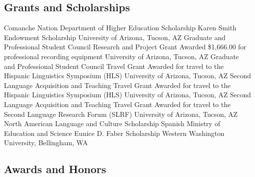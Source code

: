 \documentclass[11pt,letterpaper]{assets/tex/moderncv}
\begin{document}
\vspace{-0.2in}

\subsection{Grants and Scholarships}

        {Comanche Nation Department of Higher Education Scholarship}
        {}
        {}
        {}
        {}
        {}
        {Karen Smith Endowment Scholarship}
        {}
        {}
        {}
        {University of Arizona, Tucson, AZ}
        {Graduate and Professional Student Council Research and Project Grant}
        {\newline Awarded \$1,666.00 for professional recording equipment}
        {}
        {}
        {University of Arizona, Tucson, AZ}
        {Graduate and Professional Student Council Travel Grant}
        {\newline Awarded for travel to the Hispanic Linguistics Symposium (HLS)}
        {}
        {}
        {University of Arizona, Tucson, AZ}
        {Second Language Acquisition and Teaching Travel Grant}
        {\newline Awarded for travel to the Hispanic Linguistics Symposium (HLS)}
        {}
        {}
        {University of Arizona, Tucson, AZ}
        {Second Language Acquisition and Teaching Travel Grant}
        {\newline Awarded for travel to the Second Language Research Forum (SLRF)}
        {}
        {}
        {University of Arizona, Tucson, AZ}
        {North American Language and Culture Scholarship}
        {}
        {}
        {}
        {Spanish Ministry of Education and Science}
        {Eunice D. Faber Scholarship}
        {}
        {}
        {}
        {Western Washington University, Bellingham, WA}

\subsection{Awards and Honors}
\end{document}
